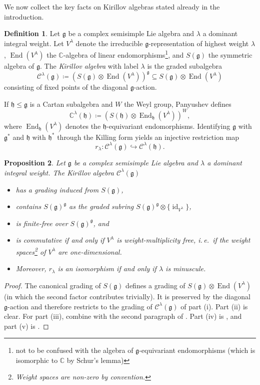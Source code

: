 \documentclass{amsart}
\newcommand{\ie}{i.\,e.}
\newcommand{\C}{\mathbb{C}}
\newcommand{\Kir}{\mathcal{C}}
\newcommand{\End}{\operatorname{End}}
\newcommand{\g}{\mathfrak{g}}
\newcommand{\h}{\mathfrak{h}}
\newcommand{\id}{\operatorname{id}}
\theoremstyle{definition}
\newtheorem{defn}{Definition}[section]
\theoremstyle{plain}
\newtheorem{prop}[defn]{Proposition}
\theoremstyle{remark}
\begin{document}
We now collect the key facts on Kirillov algebras stated already in the introduction.
\begin{defn}
    Let $\g$ be a complex semisimple Lie algebra and $\lambda$ a dominant integral weight. Let $V^\lambda$ denote the irreducible $\g$-representation of highest weight $\lambda$, $\End(V^\lambda)$ the $\C$-algebra of linear endomorphisms\footnote{not to be confused with the algebra of $\g$-equivariant endomorphisms (which is isomorphic to $\C$ by Schur's lemma)}, and $S(\g)$ the symmetric algebra of $\g$. The \emph{Kirillov algebra} with label $\lambda$ is the graded subalgebra
    $$
        \Kir^\lambda(\g)
        \coloneqq
        (S(\g)\otimes \End(V^\lambda))^\g
        \subseteq
        S(\g)\otimes \End(V^\lambda)
    $$
    consisting of fixed points of the diagonal $\g$-action.
\end{defn}

If $\h\le \g$ is a Cartan subalgebra and $W$ the Weyl group, Panyushev \cite{Panyushev2004_endoj} defines 
$$
    \C^\lambda(\h)
    \coloneqq
    (S(\h)\otimes \End_\h(V^\lambda))^W,
$$
where $\End_\h(V^\lambda)$ denotes the $\h$-equivariant endomorphisms. Identifying $\g$ with $\g^*$ and $\h$ with $\h^*$ through the Killing form yields an injective restriction map
\begin{equation}
\label{eq:Cartan_restriction_Kirillov_algebra}
    r_\lambda
    \colon
    \Kir^\lambda(\g)
    \hookrightarrow
    \Kir^\lambda(\h).
\end{equation}

\begin{prop}
\label{prop:kirillov_facts}
    Let $\g$ be a complex semisimple Lie algebra and $\lambda$ a dominant integral weight. The Kirillov algebra $\Kir^\lambda(\g)$
    \begin{itemize}
        \item[(i)] has a grading induced from $S(\g)$,
        \item[(ii)] contains $S(\g)^\g$ as the graded subring $S(\g)^\g\otimes \{\id_{V^\lambda}\}$,
        \item[(iii)] is finite-free over $S(\g)^\g$, and
        \item[(iv)] is commutative if and only if $V^\lambda$ is weight-multiplicity free, \ie\ if the weight spaces\footnote{Weight spaces are non-zero by convention.} of $V^\lambda$ are one-dimensional.
        \item[(v)] Moreover, $r_\lambda$ is an isomorphism if and only if $\lambda$ is minuscule. 
    \end{itemize}
\end{prop}
\begin{proof}
    The canonical grading of $S(\g)$ defines a grading of $S(\g)\otimes \End(V^\lambda)$ (in which the second factor contributes trivially). It is preserved by the diagonal $\g$-action and therefore restricts to the grading of $\Kir^\lambda(\g)$ of part (i). Part (ii) is clear. For part (iii), combine \cite[Thm.\,1.1]{Panyushev2004_endoj} with the second paragraph of \cite[p.\,277]{Panyushev2004_endoj}. Part (iv) is \cite[Cor.\,1]{Kirillov2001_introduction}, and part (v) is \cite[Cor.\,2.9]{Panyushev2004_endoj}.
\end{proof}
\end{document}
